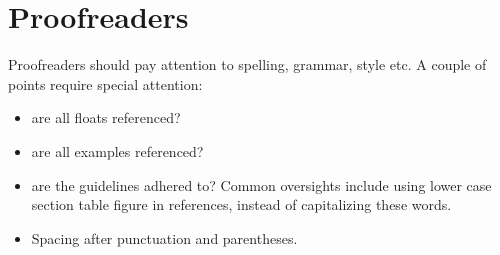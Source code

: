 \chapter{Proofreaders}
Proofreaders should pay attention to spelling, grammar, style etc. A couple of points require special attention:
\begin{itemize}
 \item are all floats referenced?
 \item are all examples referenced?
 \item are the guidelines adhered to? Common oversights include using lower case section table figure in references, instead of capitalizing these words. 
 \item Spacing after punctuation and parentheses.
\end{itemize}









